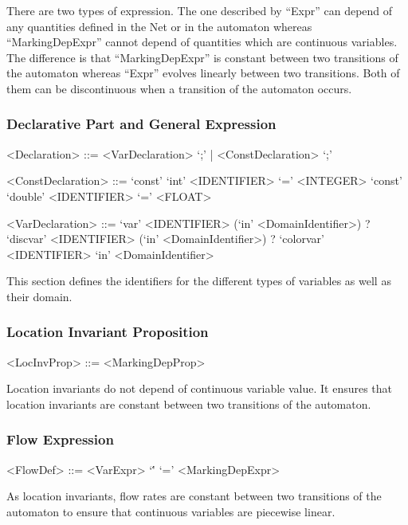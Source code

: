 \documentclass{article}
\begin{document}
There are two types of expression. The one described
by ``Expr'' can depend of any quantities defined in the Net or in the
automaton whereas ``MarkingDepExpr'' cannot depend of quantities
which are continuous variables. The difference is that
``MarkingDepExpr'' is constant between two transitions of the
automaton whereas ``Expr'' evolves linearly between two
transitions. Both of them can be discontinuous when a transition of the
automaton occurs.


\subsubsection{Declarative Part and General Expression}

\begin{scriptsize}
\begin{grammar}
  <Declaration> ::= <VarDeclaration> `;' | <ConstDeclaration> `;'

  <ConstDeclaration> ::= 
  `const' `int' <IDENTIFIER> `=' <INTEGER>
  \alt `const' `double' <IDENTIFIER> `=' <FLOAT>

  <VarDeclaration> ::= 
   `var' <IDENTIFIER> (`in' <DomainIdentifier>) ?
   \alt `discvar' <IDENTIFIER> (`in' <DomainIdentifier>) ?
   \alt `colorvar' <IDENTIFIER> `in' <DomainIdentifier>
\end{grammar}
\end{scriptsize}

This section defines the identifiers for the different types of variables
as well as their domain.

\subsubsection{Location Invariant Proposition}

\begin{scriptsize}
\begin{grammar}
  <LocInvProp> ::= <MarkingDepProp>
\end{grammar}
\end{scriptsize}

Location invariants do not depend of continuous variable value.
It ensures that location invariants are constant between two transitions
of the automaton.

\subsubsection{Flow Expression}

\begin{scriptsize}
\begin{grammar}
  <FlowDef> ::= <VarExpr> `\'' `=' <MarkingDepExpr> 
\end{grammar}
\end{scriptsize}
As location invariants, flow rates are constant between two transitions
of the automaton to ensure that continuous variables are piecewise
linear.
\end{document}
